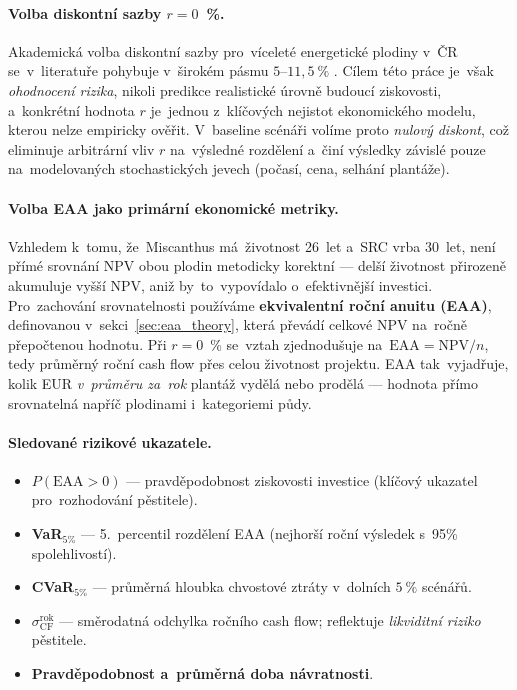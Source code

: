 \paragraph{Volba diskontní sazby $r = 0$~\%.}
Akademická volba diskontní sazby pro~víceleté energetické plodiny v~ČR
se~v~literatuře pohybuje v~širokém pásmu $5$--$11{,}5~\%$
\citep{knapek_2024,Janota2023}. Cílem této práce je~však \emph{ohodnocení
rizika}, nikoli predikce realistické úrovně budoucí ziskovosti, a~konkrétní
hodnota $r$ je~jednou z~klíčových nejistot ekonomického modelu, kterou
nelze empiricky ověřit. V~baseline scénáři volíme proto \emph{nulový
diskont}, což eliminuje arbitrární vliv $r$ na~výsledné rozdělení
a~činí výsledky závislé pouze na~modelovaných stochastických jevech
(počasí, cena, selhání plantáže).

\paragraph{Volba EAA jako primární ekonomické metriky.}
Vzhledem k~tomu, že~Miscanthus má~životnost \mbox{26 let} a~SRC vrba
\mbox{30 let}, není přímé srovnání NPV obou plodin metodicky korektní ---
delší životnost přirozeně akumuluje vyšší NPV, aniž by~to~vypovídalo
o~efektivnější investici. Pro~zachování srovnatelnosti používáme
\textbf{ekvivalentní roční anuitu (EAA)}, definovanou v~sekci~\ref{sec:eaa_theory},
která převádí celkové NPV na~ročně přepočtenou hodnotu. Při $r = 0$~\%
se~vztah zjednodušuje na~$\mathrm{EAA} = \mathrm{NPV} / n$, tedy
průměrný roční cash flow přes celou životnost projektu. EAA tak~vyjadřuje,
kolik EUR \emph{v~průměru za~rok} plantáž vydělá nebo prodělá ---
hodnota přímo srovnatelná napříč plodinami i~kategoriemi půdy.

\paragraph{Sledované rizikové ukazatele.}
\begin{itemize}
    \item \textbf{$P(\mathrm{EAA} > 0)$} --- pravděpodobnost ziskovosti
          investice (klíčový ukazatel pro~rozhodování pěstitele).
    \item \textbf{VaR$_{5\%}$} --- 5.~percentil rozdělení EAA
          (nejhorší roční výsledek s~95\% spolehlivostí).
    \item \textbf{CVaR$_{5\%}$} --- průměrná hloubka chvostové ztráty
          v~dolních $5~\%$ scénářů.
    \item \textbf{$\sigma_{\mathrm{CF}}^{\mathrm{rok}}$} --- směrodatná
          odchylka ročního cash flow; reflektuje \emph{likviditní
          riziko} pěstitele.
    \item \textbf{Pravděpodobnost a~průměrná doba návratnosti}.
\end{itemize}

